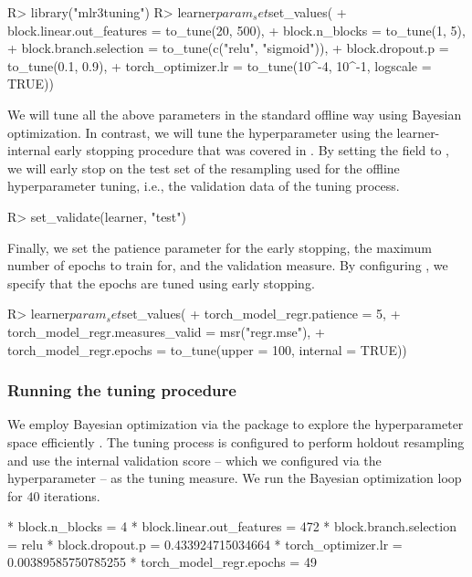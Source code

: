 \documentclass[article]{jss}
\theoremstyle{definition}
\begin{document}
\begin{CodeInput}
R> library("mlr3tuning")
R> learner$param_set$set_values(
+    block.linear.out_features = to_tune(20, 500),
+    block.n_blocks = to_tune(1, 5),
+    block.branch.selection = to_tune(c("relu", "sigmoid")),
+    block.dropout.p = to_tune(0.1, 0.9),
+    torch_optimizer.lr = to_tune(10^-4, 10^-1, logscale = TRUE))
\end{CodeInput}

We will tune all the above parameters in the standard offline way using Bayesian optimization.
In contrast, we will tune the  hyperparameter using the learner-internal early stopping procedure that was covered in .
By setting the  field to , we will early stop on the test set of the resampling used for the offline hyperparameter tuning, i.e., the validation data of the tuning process.

\begin{CodeInput}
R> set_validate(learner, "test")
\end{CodeInput}

Finally, we set the patience parameter for the early stopping, the maximum number of epochs to train for, and the validation measure.
By configuring , we specify that the epochs are tuned using early stopping.

\begin{CodeInput}
R> learner$param_set$set_values(
+    torch_model_regr.patience = 5,
+    torch_model_regr.measures_valid = msr("regr.mse"),
+    torch_model_regr.epochs = to_tune(upper = 100, internal = TRUE))
\end{CodeInput}

\subsubsection{Running the tuning procedure}

We employ Bayesian optimization via the  package to explore the hyperparameter space efficiently \citep{ref-mlr3mbo}.
The tuning process is configured to perform holdout resampling and use the internal validation score -- which we configured via the  hyperparameter -- as the tuning measure.
We run the Bayesian optimization loop for $40$ iterations.

\begin{CodeOutput}
* block.n_blocks = 4
* block.linear.out_features = 472
* block.branch.selection = relu
* block.dropout.p = 0.433924715034664
* torch_optimizer.lr = 0.00389585750785255
* torch_model_regr.epochs = 49
\end{CodeOutput}
\end{document}
